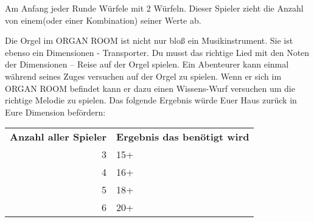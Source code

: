 






Am Anfang jeder Runde Würfele mit 2 Würfeln. Dieser Spieler zieht die Anzahl von einem(oder einer Kombination) seiner Werte ab.


Die Orgel im ORGAN ROOM ist nicht nur bloß ein Musikinstrument. Sie ist ebenso ein Dimensionen - Transporter. Du musst das richtige Lied mit den Noten der Dimensionen – Reise auf der Orgel spielen.
Ein Abenteurer kann einmal während seines Zuges versuchen auf der Orgel zu spielen. Wenn er sich im ORGAN ROOM befindet kann er dazu einen Wissens-Wurf versuchen um die richtige Melodie zu spielen. Das folgende Ergebnis würde Euer Haus zurück in Eure Dimension befördern:

\vspace{1cm}
\begin{tabular}{rl}
\textbf{ Anzahl aller Spieler} &       \textbf{Ergebnis das benötigt wird} \\
3   &    15+ \\
4   &    16+ \\
5   &    18+ \\
6   &    20+ \\
\end{tabular}

\newpage

